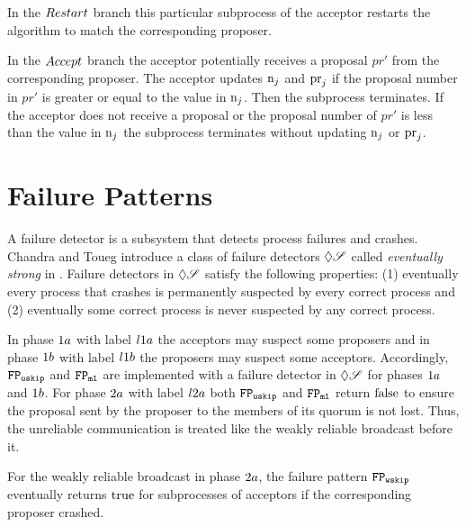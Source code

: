 In the $\mathnormal{Restart}$ branch this particular subprocess of the acceptor restarts the algorithm to match the corresponding proposer.

In the $\mathnormal{Accept}$ branch the acceptor potentially receives a proposal $pr'$ from the corresponding proposer.
The acceptor updates $\operatorname{n}_{j}$ and $\operatorname{pr}_{j}$ if the proposal number in $pr'$ is greater or equal to the value in $\operatorname{n}_{j}$.
Then the subprocess terminates.
If the acceptor does not receive a proposal or the proposal number of $pr'$ is less than the value in $\operatorname{n}_{j}$ the subprocess terminates without updating $\operatorname{n}_{j}$ or $\operatorname{pr}_{j}$.

\section{Failure Patterns}
A failure detector is a subsystem that detects process failures and crashes.
Chandra and Toueg introduce a class of failure detectors $\Diamond\mathscr{S}$ called \emph{eventually strong} in \cite{ChandraToueg96}.
Failure detectors in $\Diamond\mathscr{S}$ satisfy the following properties: (1) eventually every process that crashes is permanently suspected by every correct process and (2) eventually some correct process is never suspected by any correct process.

In phase $1a$ with label $l1a$ the acceptors may suspect some proposers and in phase $1b$ with label $l1b$ the proposers may suspect some acceptors.
Accordingly, $\mathtt{FP_{uskip}}$ and $\mathtt{FP_{ml}}$ are implemented with a failure detector in $\Diamond\mathscr{S}$ for phases $1a$ and $1b$.
For phase $2a$ with label $l2a$ both $\mathtt{FP_{uskip}}$ and $\mathtt{FP_{ml}}$ return $\operatorname{false}$ to ensure the proposal sent by the proposer to the members of its quorum is not lost.
Thus, the unreliable communication is treated like the weakly reliable broadcast before it.

For the weakly reliable broadcast in phase $2a$, the failure pattern $\mathtt{FP_{wskip}}$ eventually returns $\operatorname{true}$ for subprocesses of acceptors if the corresponding proposer crashed.

